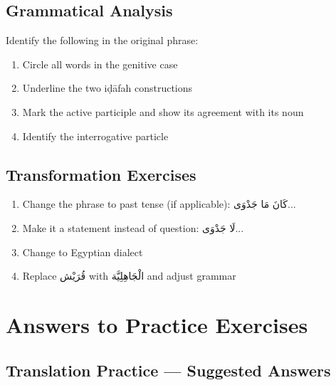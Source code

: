 \documentclass[letterpaper,12pt]{article}
\begin{document}
\subsection{Grammatical Analysis}

Identify the following in the original phrase:

\begin{enumerate}
\item Circle all words in the genitive case
\item Underline the two iḍāfah constructions
\item Mark the active participle and show its agreement with its noun
\item Identify the interrogative particle
\end{enumerate}

\subsection{Transformation Exercises}

\begin{enumerate}
\item Change the phrase to past tense (if applicable): \textarabic{كَانَ مَا جَدْوَى...}
\vspace{1.5em}

\item Make it a statement instead of question: \textarabic{لَا جَدْوَى...}
\vspace{1.5em}

\item Change to Egyptian dialect
\vspace{1.5em}

\item Replace \textarabic{قُرَيْش} with \textarabic{الْجَاهِلِيَّة} and adjust grammar
\vspace{1.5em}
\end{enumerate}

\section{Answers to Practice Exercises}

\subsection{Translation Practice — Suggested Answers}
\end{document}
